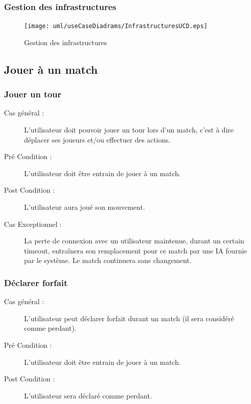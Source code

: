 \documentclass[a4paper]{report}
\begin{document}
\subsubsection{Gestion des infrastructures}
\begin{figure}[H]
    \begin{center}
        \texttt{[image: uml/useCaseDiadrams/InfrastructuresUCD.eps]}
        \caption{Gestion des infrastructures}
    \end{center}
\end{figure}


\subsection{Jouer à un match}
\subsubsection{Jouer un tour}
\begin{description}
    \item[Cas général :] L'\gls{utilisateur} doit pouvoir jouer un tour lors d'un match, c'est à dire déplacer ses \glspl{joueur} et/ou effectuer des actions.
    \item[Pré Condition  :] L'\gls{utilisateur} doit être entrain de jouer à un match.
    \item[Post Condition :] L'\gls{utilisateur} aura joué son mouvement.
    \item[Cas Exceptionnel :] La perte de connexion avec un \gls{utilisateur} maintenue, durant un certain timeout, entraînera son remplacement pour ce match par une IA fournie par le système. Le match continuera sans changement.
\end{description}
\subsubsection{Déclarer forfait}
\begin{description}
    \item[Cas général :] L'\gls{utilisateur} peut déclarer forfait durant un match (il sera considéré comme perdant).
    \item[Pré Condition  :] L'\gls{utilisateur} doit être entrain de jouer à un match.
    \item[Post Condition :] L'\gls{utilisateur} sera déclaré comme perdant.
\end{description}

\end{document}
